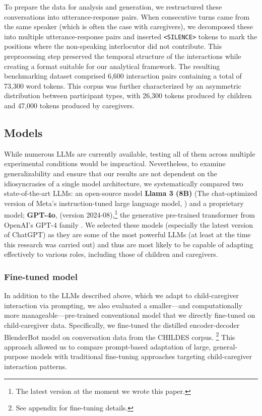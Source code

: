 To prepare the data for analysis and generation, we restructured these conversations into utterance-response pairs.  When consecutive turns came from the same speaker (which is often the case with caregivers), we decomposed these into multiple utterance-response pairs and inserted \texttt{<SILENCE>} tokens to mark the positions where the non-speaking interlocutor did not contribute. This preprocessing step preserved the temporal structure of the interactions while creating a format suitable for our analytical framework. The resulting benchmarking dataset comprised 6,600 interaction pairs containing a total of 73,300 word tokens. This corpus was further characterized by an asymmetric distribution between participant types, with 26,300 tokens produced by children and 47,000 tokens produced by caregivers.



\subsection{Models}  

While numerous LLMs are currently available, testing all of them across multiple experimental conditions would be impractical. Nevertheless, to examine generalizability and ensure that our results are not dependent on the idiosyncrasies of a single model architecture, we systematically compared two state-of-the-art LLMs: an open-source model \textbf{Llama 3 (8B)} (The chat-optimized version of Meta's instruction-tuned large language model, \citep{touvron2023llama}) and a proprietary model; \textbf{GPT-4o}, (version 2024-08),\footnote{The latest version at the moment we wrote this paper.} the generative pre-trained transformer from OpenAI's GPT-4 family \citep{achiam2023gpt}. We selected these models (especially the latest version of ChatGPT) as they are some of the most powerful LLMs (at least at the time this research was carried out) and thus are most likely to be capable of adapting effectively to various roles, including those of children and caregivers.

\subsubsection{Fine-tuned model}  

In addition to the LLMs described above, which we adapt to child-caregiver interaction via prompting, we also evaluated a smaller---and computationally more manageable—pre-trained conventional model that we directly fine-tuned on child-caregiver data. Specifically, we fine-tuned the distilled encoder-decoder BlenderBot model \citep{roller2020recipes} on conversation data from the CHILDES corpus. \footnote{See appendix for fine-tuning details.} This approach allowed us to compare prompt-based adaptation of large, general-purpose models with traditional fine-tuning approaches targeting child-caregiver interaction patterns.




